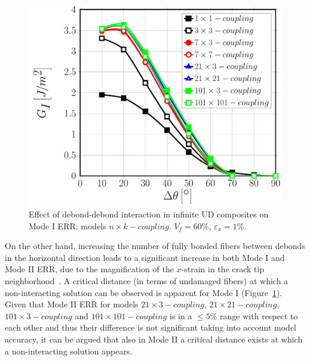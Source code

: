 \documentclass[review]{elsarticle}
\begin{document}
\begin{figure}[!h]
\centering
\includegraphics[width=\textwidth]{nxk-coupling-vf60-GI.pdf}
\caption{Effect of debond-debond interaction in infinite UD composites on Mode I ERR: models $n\times k-coupling$. $V_{f}=60\%$, $\varepsilon_{x}=1\%$.}\label{fig:debonddebondGI}
\end{figure}

On the other hand, increasing the number of fully bonded fibers between debonds in the horizontal direction leads to a significant increase in both Mode I and Mode II ERR, due to the magnification of the $x$-strain in the crack tip neighborhood~\cite{DiStasio2019}. A critical distance (in terms of undamaged fibers) at which a non-interacting solution can be observed is apparent for Mode I (Figure~\ref{fig:debonddebondGI}). Given that Mode II ERR for models $21\times 3-coupling$, $21\times 21-coupling$, $101\times 3-coupling$ and $101\times 101-coupling$ is in a $\leq5\%$ range with respect to each other and thus their difference is not significant taking into account model accuracy, it can be argued that also in Mode II a critical distance exists at which a non-interacting solution appears.
\end{document}
